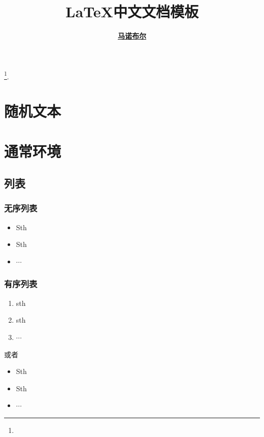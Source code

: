 \documentclass[a4paper, 12pt, UTF8]{ctexart}
\begin{document}
\title{\bf \LaTeX 中文文档模板} \author{\bf
  \href{https://matnoble.github.io/about/}{马诺布尔}} \date{}

\maketitle
\tableofcontents
\footnote{\noindent {} \newline
  \updatetext{\today}}.

\clearpage
\listoflistings

\clearpage

\section{随机文本}
\zhlipsum[2-3]

\clearpage

\section{通常环境}

\subsection{列表}

\subsubsection{无序列表}
\begin{itemize}
    \item Sth
    \item Sth
    \item $\cdots$
\end{itemize}
\subsubsection{有序列表}
\begin{enumerate}
    \item sth
    \item sth
    \item $\cdots$
\end{enumerate}
或者
\begin{itemize}
    \item[(1)] Sth
    \item[(2)] Sth
    \item[(3)] $\cdots$
\end{itemize}
\end{document}

